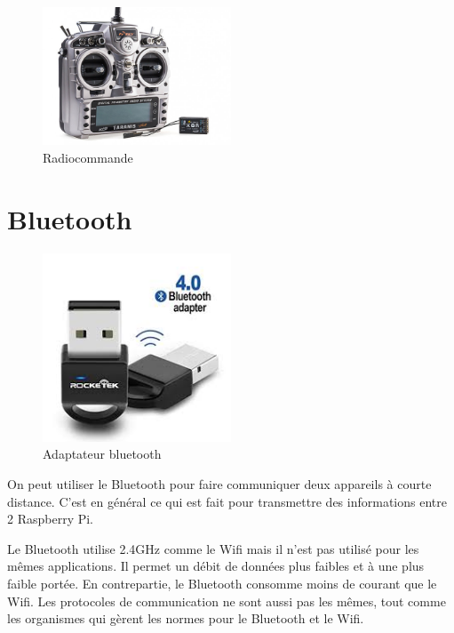 \documentclass[a4paper, 11pt]{report}
\begin{document}
\begin{figure}[h!]
\begin{centering}
\includegraphics[width=0.5\textwidth]{images/taranis.jpg}
\caption{Radiocommande}
\par\end{centering}
\end{figure}

\section{Bluetooth}

\begin{figure}[h!]
\begin{centering}
\includegraphics[width=0.5\textwidth]{images/dongleBluetooth.jpeg}
\caption{Adaptateur bluetooth}
\par\end{centering}
\end{figure}

On peut utiliser le Bluetooth pour faire communiquer deux appareils à courte distance. C'est en général ce qui est fait pour transmettre des informations entre 2 Raspberry Pi.

Le Bluetooth utilise 2.4GHz comme le Wifi mais il n'est pas utilisé pour les mêmes applications. Il permet un débit de données plus faibles et à une plus faible portée. En contrepartie, le Bluetooth consomme moins de courant que le Wifi. Les protocoles de communication ne sont aussi pas les mêmes, tout comme les organismes qui gèrent les normes pour le Bluetooth et le Wifi.
\end{document}
